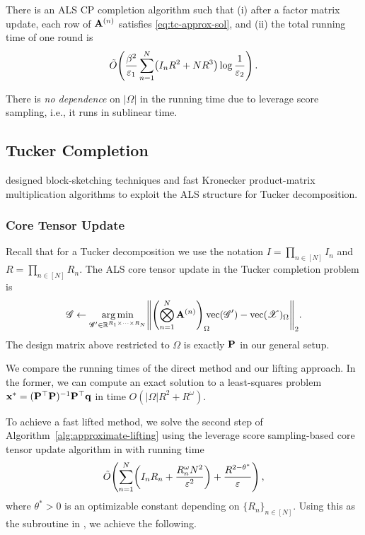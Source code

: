 \begin{corollary}
There is an ALS CP completion algorithm such that
(i) after a factor matrix update, each row of $\mathbf{A}^{(n)}$ satisfies \eqref{eq:tc-approx-sol},
and (ii) the total running time of one round is
\[
    \tilde{O} \parens*{\frac{\beta^2}{\varepsilon_1} \sum_{n=1}^N \parens*{I_n R^2 + NR^3} \log \frac{1}{\epsilon_2}}\,.
\]
\end{corollary}

\noindent
There is \emph{no dependence} on $|\Omega|$ in the running time due to leverage score sampling, i.e., it runs in sublinear time.

\subsection{Tucker Completion}

\citet{fahrbach2022subquadratic} designed block-sketching techniques and fast Kronecker product-matrix multiplication algorithms
to exploit the ALS structure for Tucker decomposition.

\subsubsection{Core Tensor Update}
Recall that for a Tucker decomposition we use the notation $I=\prod_{n\in[N]} I_n$ and $R=\prod_{n\in[N]} R_n$.
The ALS core tensor update in the Tucker completion problem is
\[
    \tensor{G}
    \leftarrow
    \argmin_{\tensor{G}' \in\R^{R_1 \times \cdots \times R_N}} \norm*{\parens*{\bigotimes_{n=1}^N\mat{A}^{(n)}}_{\Omega} \hspace{-0.2cm}\vvec(\tensor{G}') - \vvec(\tensor{X})_{\Omega}}_2.
\]
The design matrix above restricted to $\Omega$ is exactly $\mathbf{P}$ in our general setup.

We compare the running times of the direct method and our lifting approach.
In the former, we can compute an exact solution to a least-squares problem $\mathbf{x}^* = (\mathbf{P}^\top \mathbf{P})^{-1} \mathbf{P}^\top \mathbf{q}$ in time $O(|\Omega| R^2 + R^\omega)$.

To achieve a fast lifted method, we solve the second step of Algorithm~\ref{alg:approximate-lifting}
using the leverage score sampling-based
core tensor update algorithm in \citep[Theorem 1.2]{fahrbach2022subquadratic}
with running time
\[
    \tilde{O} \parens*{
        \sum_{n=1}^N \parens*{ I_n R_n  + \frac{R_n^\omega N^2}{\varepsilon^2}} + \frac{R^{2-\theta^*}}{\varepsilon}
    }\,,
\]
where $\theta^*>0$ is an optimizable constant depending on $\{R_n\}_{n\in[N]}$.
Using this as the \ApproximateSolve subroutine in , we achieve the following.

